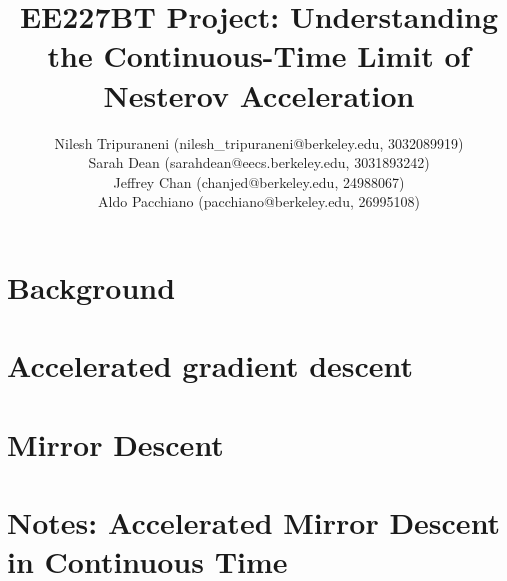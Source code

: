 \documentclass{article}
\title{EE227BT Project:
Understanding the Continuous-Time Limit of Nesterov Acceleration}
\author{Nilesh Tripuraneni (nilesh\_tripuraneni@berkeley.edu, 3032089919)\\ Sarah Dean (sarahdean@eecs.berkeley.edu, 3031893242)\\ Jeffrey Chan (chanjed@berkeley.edu, 24988067)\\ Aldo Pacchiano (pacchiano@berkeley.edu, 26995108)}
\begin{document}
\maketitle 

\section{Background}




\section{Accelerated gradient descent }




\section{Mirror Descent}




\section{Notes: Accelerated Mirror Descent in Continuous Time}






\end{document}
